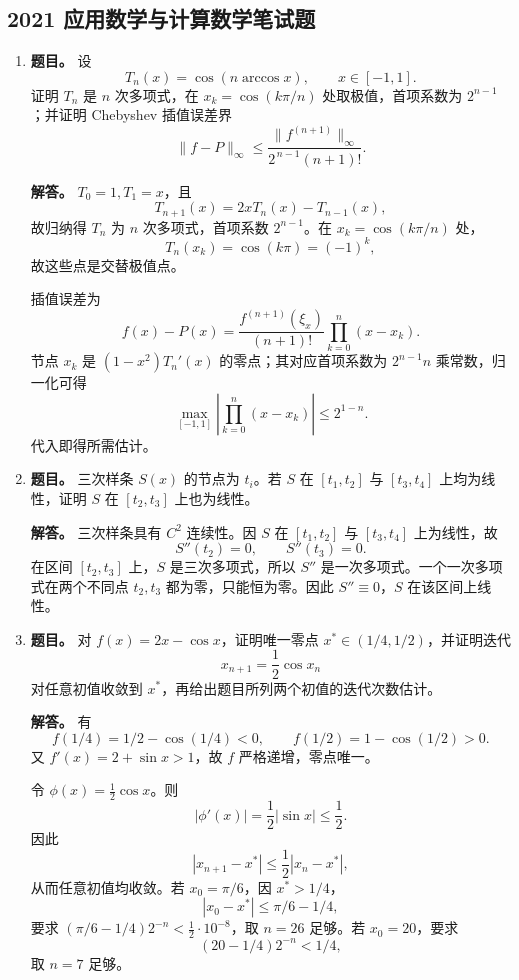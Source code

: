﻿\documentclass[UTF8,12pt]{ctexart}
\begin{document}
\subsection{2021 应用数学与计算数学笔试题}
\begin{enumerate}[label=\textbf{\arabic*.},leftmargin=2.2em]
\item \textbf{题目。} 设
\[
T_n(x)=\cos(n\arccos x),\qquad x\in[-1,1].
\]
证明 \(T_n\) 是 \(n\) 次多项式，在 \(x_k=\cos(k\pi/n)\) 处取极值，首项系数为 \(2^{n-1}\)；并证明 Chebyshev 插值误差界
\[
\|f-P\|_\infty\le \frac{\|f^{(n+1)}\|_\infty}{2^{\,n-1}(n+1)!}.
\]

\textbf{解答。} \(T_0=1,T_1=x\)，且
\[
T_{n+1}(x)=2xT_n(x)-T_{n-1}(x),
\]
故归纳得 \(T_n\) 为 \(n\) 次多项式，首项系数 \(2^{n-1}\)。在 \(x_k=\cos(k\pi/n)\) 处，
\[
T_n(x_k)=\cos(k\pi)=(-1)^k,
\]
故这些点是交替极值点。

插值误差为
\[
f(x)-P(x)=\frac{f^{(n+1)}(\xi_x)}{(n+1)!}\prod_{k=0}^n(x-x_k).
\]
节点 \(x_k\) 是 \((1-x^2)T_n'(x)\) 的零点；其对应首项系数为 \(2^{n-1}n\) 乘常数，归一化可得
\[
\max_{[-1,1]}\left|\prod_{k=0}^n(x-x_k)\right|\le 2^{1-n}.
\]
代入即得所需估计。

\item \textbf{题目。} 三次样条 \(S(x)\) 的节点为 \(t_i\)。若 \(S\) 在 \([t_1,t_2]\) 与 \([t_3,t_4]\) 上均为线性，证明 \(S\) 在 \([t_2,t_3]\) 上也为线性。

\textbf{解答。} 三次样条具有 \(C^2\) 连续性。因 \(S\) 在 \([t_1,t_2]\) 与 \([t_3,t_4]\) 上为线性，故
\[
S''(t_2)=0,\qquad S''(t_3)=0.
\]
在区间 \([t_2,t_3]\) 上，\(S\) 是三次多项式，所以 \(S''\) 是一次多项式。一个一次多项式在两个不同点 \(t_2,t_3\) 都为零，只能恒为零。因此 \(S''\equiv0\)，\(S\) 在该区间上线性。

\item \textbf{题目。} 对 \(f(x)=2x-\cos x\)，证明唯一零点 \(x^\ast\in(1/4,1/2)\)，并证明迭代
\[
x_{n+1}=\frac12\cos x_n
\]
对任意初值收敛到 \(x^\ast\)，再给出题目所列两个初值的迭代次数估计。

\textbf{解答。} 有
\[
f(1/4)=1/2-\cos(1/4)<0,\qquad f(1/2)=1-\cos(1/2)>0.
\]
又 \(f'(x)=2+\sin x>1\)，故 \(f\) 严格递增，零点唯一。

令 \(\phi(x)=\frac12\cos x\)。则
\[
|\phi'(x)|=\frac12|\sin x|\le\frac12.
\]
因此
\[
|x_{n+1}-x^\ast|\le\frac12|x_n-x^\ast|,
\]
从而任意初值均收敛。若 \(x_0=\pi/6\)，因 \(x^\ast>1/4\)，
\[
|x_0-x^\ast|\le \pi/6-1/4,
\]
要求 \((\pi/6-1/4)2^{-n}<\frac12\cdot10^{-8}\)，取 \(n=26\) 足够。若 \(x_0=20\)，要求
\[
(20-1/4)2^{-n}<1/4,
\]
取 \(n=7\) 足够。


\end{enumerate}
\end{document}
